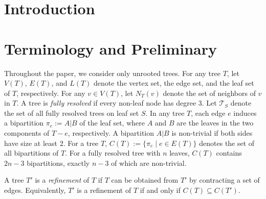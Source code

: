 \documentclass{bmcart}
\begin{document}


\section{Introduction}







\section{Terminology and Preliminary}\label{sec:prelim}

Throughout the paper, we consider only unrooted trees. For any tree $T$, let $V(T)$, $E(T)$, and $L(T)$ denote the vertex set, the edge set, and the leaf set of $T$, respectively. For any $v\in V(T)$, let $N_T(v)$ denote the set of neighbors of $v$ in $T$. A tree is \textit{fully resolved} if every non-leaf node has degree $3$. Let $\mathcal{T}_S$ denote the set of all fully resolved trees on leaf set $S$. In any tree $T$, each edge $e$ induces a bipartition $\pi_e := A|B$ of the leaf set, where $A$ and $B$ are the leaves in the two components of $T-e$, respectively. A bipartition $A|B$ is non-trivial if both sides have size at least $2$. For a tree $T$, $C(T) := \{\pi_e \mid e\in E(T)\}$ denotes the set of all bipartitions of $T$. For a fully resolved tree with $n$ leaves, $C(T)$ contains $2n-3$ bipartitions, exactly $n-3$ of which are non-trivial. \smallskip

A tree $T'$ is a \textit{refinement} of $T$ if $T$ can be obtained from $T'$ by contracting a set of edges. Equivalently, $T'$ is a refinement of $T$ if and only if $C(T) \subseteq C(T')$.\smallskip
\end{document}
